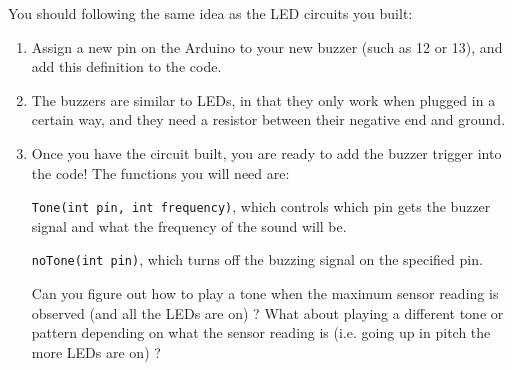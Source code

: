 \documentclass[11pt]{article}
\begin{document}
You should following the same idea as the LED circuits you built:

\begin{enumerate}
\item Assign a new pin on the Arduino to your new buzzer (such as 12 or 13), and add this definition to the code.
\item The buzzers are similar to LEDs, in that they only work when plugged in a certain way, and they need a resistor
between their negative end and ground.
\item Once you have the circuit built, you are ready to add the buzzer trigger into the code! The functions you will need
are:

\texttt{Tone(int pin, int frequency)}, which controls which pin gets the buzzer signal and what the frequency of the sound
will be.

\texttt{noTone(int pin)}, which turns off the buzzing signal on the specified pin.

Can you figure out how to play a tone when the maximum sensor reading is observed (and all the LEDs are on) ? What
about playing a different tone or pattern depending on what the sensor reading is (i.e. going up in pitch the more
LEDs are on) ?
\end{enumerate}
\end{document}
